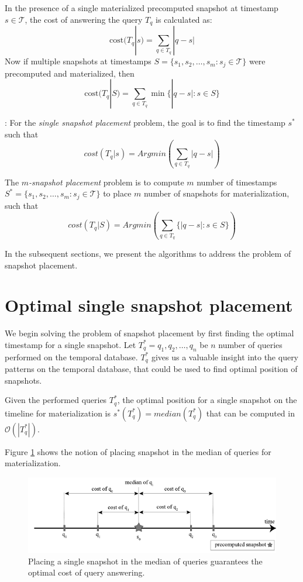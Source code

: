 \begin{defn} 
	In the presence of a single materialized precomputed snapshot at timestamp $s \in \mathcal{T}$, the cost of answering the query $T_q$ is calculated as:
	$$\mathrm{cost}(T_q | s) = \sum_{q\in T_q} |q - s|$$
	Now if multiple snapshots at timestamps $S=\{s_1, s_2, \dots, s_m : s_j \in \mathcal{T}\}$ were precomputed and materialized, then 
	$$\mathrm{cost}(T_q|S) = \sum_{q\in T_q} \min\{|q-s| : s\in S\}$$
\label{defn:cost_of_query_answering}
\end{defn}

\begin{defn}: 
    For the \emph{single snapshot placement} problem, the goal is to find the timestamp $s^*$ such that 
	$$cost(T_q|s)= Arg min(\sum_{q\in T_q}|q - s|)$$

	The \emph{$m$-snapshot placement} problem is to compute $m$ number of timestamps $S^*=\{s_1, s_2, \dots, s_m: s_j \in \mathcal{T}\}$ to place $m$ number of snapshots for materialization, such that 
	$$cost(T_q|S)= Arg min(\sum_{q\in T_q}\{|q - s|:s \in S\})$$
\label{defn:optimal_snapshot_placement}
\end{defn}

In the subsequent sections, we present the algorithms to address the problem of snapshot placement.

\section{Optimal single snapshot placement}
We begin solving the problem of snapshot placement by first finding the optimal timestamp for a single snapshot. Let $T_q^* = {q_1,q_2, \dots , q_n}$ be $n$ number of queries performed on the temporal database. $T_q^*$ gives us a valuable insight into the query patterns on the temporal database, that could be used to find optimal position of snapshots.

\begin{prop}
	Given the performed queries $T_q^*$, the optimal position for a single snapshot on the timeline for materialization is $s^*(T_q^*)=median(T_q^*)$ that can be computed in $\mathcal{O}(|T_q^*|)$. 
\label{prop:compute-median}
\end{prop}
    
Figure \ref{fig:optimal_materialization} shows the notion of placing snapshot in the median of queries for materialization.

\begin{figure}
	\centering
	\includegraphics[width=\textwidth]{figs/optimal_materialization.pdf}
	\caption{Placing a single snapshot in the median of queries guarantees the optimal cost of query answering.}
	\label{fig:optimal_materialization}
\end{figure}


